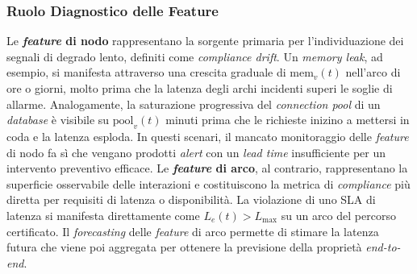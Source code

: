 \subsubsection{Ruolo Diagnostico delle Feature}
\label{sec:ruolo_diagnostico}

Le \textbf{\textit{feature} di nodo} rappresentano la sorgente primaria per l'individuazione dei
segnali di degrado lento, definiti come \textit{compliance drift}. Un \textit{memory leak}, ad
esempio, si manifesta attraverso una crescita graduale di $\text{mem}_v(t)$ nell'arco di ore o
giorni, molto prima che la latenza degli archi incidenti superi le soglie di allarme. Analogamente,
la saturazione progressiva del \textit{connection pool} di un \textit{database} è visibile su
$\text{pool}_v(t)$ minuti prima che le richieste inizino a mettersi in coda e la latenza esploda.
In questi scenari, il mancato monitoraggio delle \textit{feature} di nodo fa sì che vengano
prodotti \textit{alert} con un \textit{lead time} insufficiente per un intervento preventivo
efficace. Le \textbf{\textit{feature} di arco}, al contrario, rappresentano la superficie
osservabile delle interazioni e costituiscono la metrica di \textit{compliance} più diretta per
requisiti di latenza o disponibilità. La violazione di uno \gls{SLA} di latenza si manifesta
direttamente come $L_e(t) > L_{\max}$ su un arco del percorso certificato. Il \textit{forecasting}
delle \textit{feature} di arco permette di stimare la latenza futura che viene poi aggregata per
ottenere la previsione della proprietà \textit{end-to-end}.

